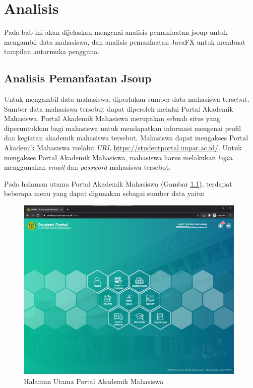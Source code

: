 \chapter{Analisis}
\label{chap:analisis}

Pada bab ini akan dijelaskan mengenai analisis pemanfaatan jsoup untuk mengambil data mahasiswa, dan analisis pemanfaatan JavaFX untuk membuat tampilan antarmuka pengguna.

\section{Analisis Pemanfaatan Jsoup}
Untuk mengambil data mahasiswa, diperlukan sumber data mahasiswa tersebut. Sumber data mahasiswa tersebut dapat diperoleh melalui Portal Akademik Mahasiswa. Portal Akademik Mahasiswa merupakan sebuah situs yang diperuntukkan bagi mahasiswa untuk mendapatkan informasi mengenai profil dan kegiatan akademik mahasiswa tersebut. Mahasiswa dapat mengakses Portal Akademik Mahasiswa melalui \textit{URL} \url{https://studentportal.unpar.ac.id/}. Untuk mengakses Portal Akademik Mahasiswa, mahasiswa harus melakukan \textit{login} menggunakan \textit{email} dan \textit{password} mahasiswa tersebut.

Pada halaman utama Portal Akademik Mahasiswa (Gambar \ref{fig:3_home}), terdapat beberapa menu yang dapat digunakan sebagai sumber data yaitu:

\begin{figure}[H]
	\centering
	\includegraphics[scale=0.45]{Gambar/home.png}
	\caption{Halaman Utama Portal Akademik Mahasiswa} 
	\label{fig:3_home}
\end{figure}

